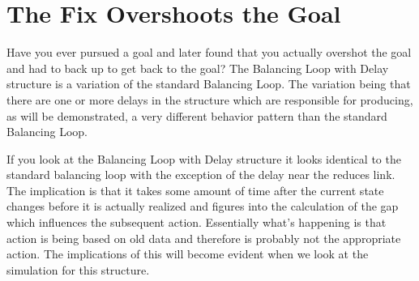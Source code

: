 \documentclass[]{memoir}
\begin{document}
\section{The Fix Overshoots the Goal}

Have you ever pursued a goal and later found that you actually overshot
the goal and had to back up to get back to the goal? The Balancing Loop
with Delay structure is a variation of the standard Balancing Loop. The
variation being that there are one or more delays in the structure which
are responsible for producing, as will be demonstrated, a very different
behavior pattern than the standard Balancing Loop.

If you look at the Balancing Loop with Delay structure it looks
identical to the standard balancing loop with the exception of the delay
near the reduces link. The implication is that it takes some amount of
time after the current state changes before it is actually realized and
figures into the calculation of the gap which influences the subsequent
action. Essentially what's happening is that action is being based on
old data and therefore is probably not the appropriate action. The
implications of this will become evident when we look at the simulation
for this structure.

\FloatBarrier 
\end{document}
